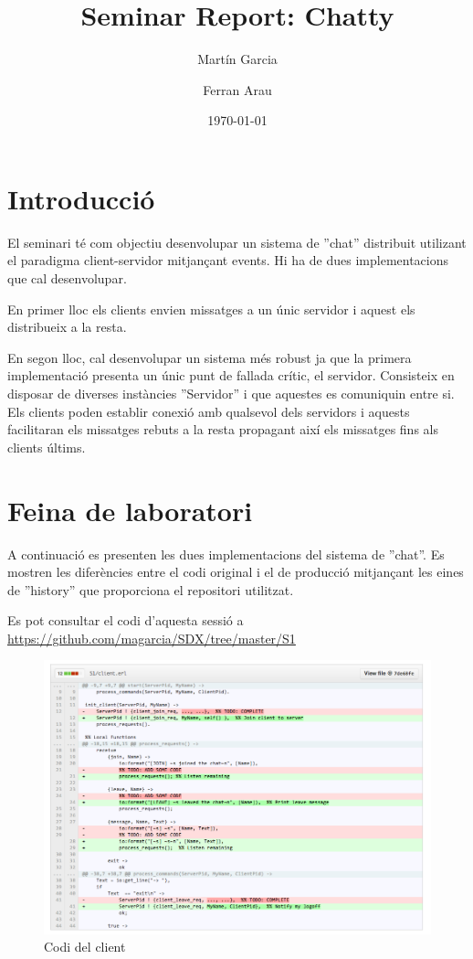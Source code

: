 \documentclass[a4paper, 11pt]{article}
\title{Seminar Report: Chatty}
\author{Martín Garcia \and Ferran Arau}
\date{\today{}}
\begin{document}
\maketitle

\section{Introducció}


El seminari té com objectiu desenvolupar un sistema de ''chat'' distribuit
utilizant el paradigma client-servidor mitjançant events. Hi ha de dues
implementacions que cal desenvolupar.

En primer lloc els clients envien missatges a un únic servidor i aquest els
distribueix a la resta. 

En segon lloc, cal desenvolupar un sistema més robust ja que la primera
implementació presenta un únic punt de fallada crític, el servidor. Consisteix
en disposar de diverses instàncies ''Servidor'' i que aquestes es comuniquin
entre si. Els clients poden establir conexió amb qualsevol dels servidors i
aquests facilitaran els missatges rebuts a la resta propagant així
els missatges fins als clients últims.

\section{Feina de laboratori}

A continuació es presenten les dues implementacions del sistema de ''chat''. Es
mostren les diferències entre el codi original i el de producció mitjançant les
eines de ''history'' que proporciona el repositori utilitzat. 

Es pot consultar el codi d'aquesta sessió a
\url{https://github.com/magarcia/SDX/tree/master/S1}

\begin{figure}[H]
	\centering
    \includegraphics[width=1.0\textwidth]{figures/client}
    \caption{Codi del client \label{fig:clientcode}}    
\end{figure}
\end{document}
